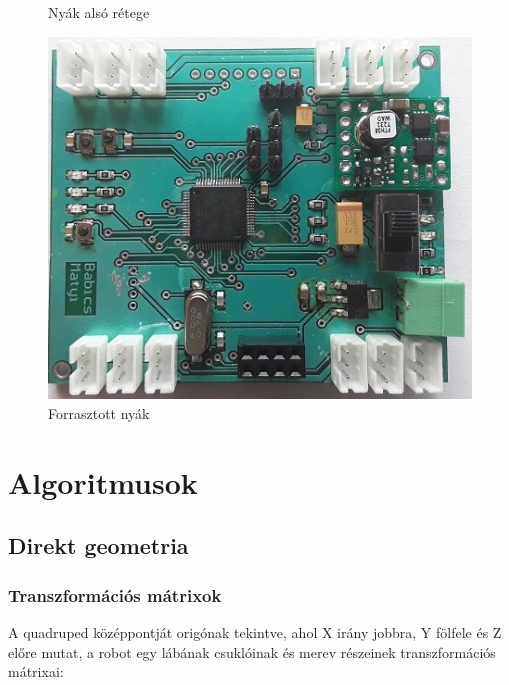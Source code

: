 \documentclass{article}
\begin{document}
\begin{figure}
\begin{minipage}{0.3\textwidth}
		\caption{Nyák alsó rétege}
	\end{minipage}\hfill
	\begin{minipage}{0.3\textwidth}
		\centering
		\includegraphics[width=\textwidth]{nyakforr}
		\caption{Forrasztott nyák}
	\end{minipage}
\end{figure}
\section{Algoritmusok}
\subsection{Direkt geometria}
\subsubsection{Transzformációs mátrixok}
A quadruped középpontját origónak tekintve, ahol X irány jobbra, Y fölfele és Z előre mutat, a robot egy lábának csuklóinak és merev részeinek transzformációs mátrixai:
\end{document}
